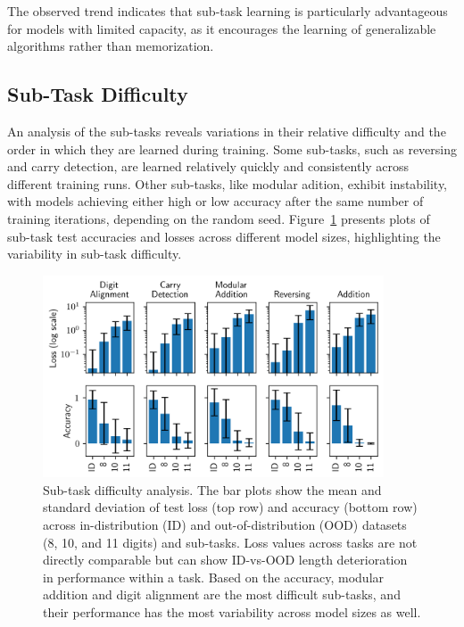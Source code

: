 The observed trend indicates that sub-task learning is particularly advantageous for models with limited capacity, as it encourages the learning of generalizable algorithms rather than memorization.

\subsection{Sub-Task Difficulty}

An analysis of the sub-tasks reveals variations in their relative difficulty and the order in which they are learned during training. Some sub-tasks, such as reversing and carry detection, are learned relatively quickly and consistently across different training runs. Other sub-tasks, like modular adition, exhibit instability, with models achieving either high or low accuracy after the same number of training iterations, depending on the random seed. Figure~\ref{fig:subtask_difficulty} presents plots of sub-task test accuracies and losses across different model sizes, highlighting the variability in sub-task difficulty.

\begin{figure}[h!]
    \centering
    \includegraphics[width=0.9\textwidth]{fig/subtask_difficulty.png}
    \caption{Sub-task difficulty analysis. The bar plots show the mean and standard deviation of test loss (top row) and accuracy (bottom row) across in-distribution (ID) and out-of-distribution (OOD) datasets (8, 10, and 11 digits) and sub-tasks. Loss values across tasks are not directly comparable but can show ID-vs-OOD length deterioration in performance within a task. Based on the accuracy, modular addition and digit alignment are the most difficult sub-tasks, and their performance has the most variability across model sizes as well.}
    \label{fig:subtask_difficulty}
\end{figure}
